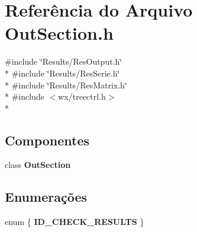 \section{Referência do Arquivo Out\+Section.\+h}
\label{_out_section_8h}
{\ttfamily \#include \char`\"{}Results/\+Res\+Output.\+h\char`\"{}}\\*
{\ttfamily \#include \char`\"{}Results/\+Res\+Serie.\+h\char`\"{}}\\*
{\ttfamily \#include \char`\"{}Results/\+Res\+Matrix.\+h\char`\"{}}\\*
{\ttfamily \#include $<$wx/treectrl.\+h$>$}\\*
\subsection*{Componentes}
\begin{DoxyCompactItemize}
\item 
class {\bf Out\+Section}
\end{DoxyCompactItemize}
\subsection*{Enumerações}
\begin{DoxyCompactItemize}
\item 
enum \{ {\bf I\+D\+\_\+\+C\+H\+E\+C\+K\+\_\+\+R\+E\+S\+U\+L\+TS}
 \}
\end{DoxyCompactItemize}
